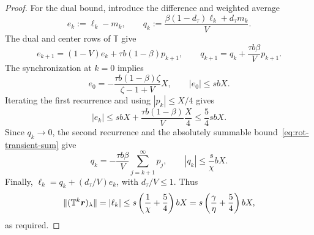 \begin{proof}
For the dual bound, introduce the difference and weighted average
\[
e_k:=\ell_k-m_k,
\qquad q_k:=\frac{\beta(1-d_\tau)\ell_k+d_\tau m_k}{V}.
\]
The dual and center rows of \(\mathbb T\) give
\[
e_{k+1}=(1-V)e_k+\tau b(1-\beta)p_{k+1},
\qquad q_{k+1}=q_k+\frac{\tau b\beta}{V}p_{k+1}.
\]
The synchronization at \(k=0\) implies
\[
e_0=-\frac{\tau b(1-\beta)\zeta}{\zeta-1+V}X,
\qquad |e_0|\le sbX.
\]
Iterating the first recurrence and using \(|p_k|\le X/4\) gives
\[
|e_k|\le sbX+\frac{\tau b(1-\beta)}V\frac X4\le\frac54sbX.
\]
Since \(q_k\to0\), the second recurrence and the absolutely summable
bound~\eqref{eq:rot-transient-sum} give
\[
q_k=-\frac{\tau b\beta}V\sum_{j=k+1}^{\infty}p_j,
\qquad |q_k|\le\frac{s}{\chi}bX.
\]
Finally, \(\ell_k=q_k+(d_\tau/V)e_k\), with \(d_\tau/V\le1\).
Thus
\[
\|(\mathbb T^k\bm{r})_\lambda\|=|\ell_k|
\le s\left(\frac1\chi+\frac54\right)bX
=s\left(\frac\gamma\eta+\frac54\right)bX,
\]
as required.
\end{proof}
